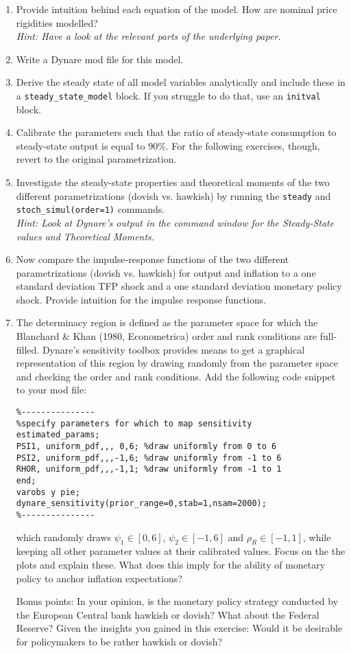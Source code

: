 \documentclass{article}
\begin{document}
\begin{enumerate}
	\item Provide intuition behind each equation of the model. How are nominal price rigidities modelled?\\\emph{Hint: Have a look at the relevant parts of the underlying paper.}
  \item Write a Dynare mod file for this model.
	\item Derive the steady state of all model variables analytically and include these in a \texttt{steady\_state\_model} block.
   If you struggle to do that, use an \texttt{initval} block.
	\item Calibrate the parameters such that the ratio of steady-state consumption to steady-state output is equal to 90\%.
  For the following exercises, though, revert to the original parametrization.		
	\item Investigate the steady-state properties and theoretical moments of the two different parametrizations (dovish vs. hawkish) 
    by running the \texttt{steady} and \texttt{stoch\_simul(order=1)} commands.\\\emph{Hint: Look at Dynare's output in the command window for the Steady-State values and Theoretical Moments.}
	\item Now compare the impulse-response functions of the two different parametrizations (dovish vs. hawkish) for output and inflation
    to a one standard deviation TFP shock and a one standard deviation monetary policy shock.
  Provide intuition for the impulse response functions.
	\item The determinacy region is defined as the parameter space for which the Blanchard \& Khan (1980, Econometrica) order and rank conditions are full-filled.
  Dynare's sensitivity toolbox provides means to get a graphical representation of this region by drawing randomly from the parameter space and checking the order and rank conditions.
  Add the following code snippet to your mod file:
\begin{verbatim}
%---------------
%specify parameters for which to map sensitivity
estimated_params;
PSI1, uniform_pdf,,, 0,6; %draw uniformly from 0 to 6
PSI2, uniform_pdf,,,-1,6; %draw uniformly from -1 to 6
RHOR, uniform_pdf,,,-1,1; %draw uniformly from -1 to 1
end;
varobs y pie;
dynare_sensitivity(prior_range=0,stab=1,nsam=2000);		
%---------------
\end{verbatim}	
which randomly draws $\psi_1 \in [0,6]$, $\psi_2 \in [-1,6]$ and $\rho_R \in [-1,1]$, while keeping all other parameter values at their calibrated values.
Focus on the the plots and explain these.
What does this imply for the ability of monetary policy to anchor inflation expectations?
\item[Bonus points:] In your opinion, is the monetary policy strategy conducted by the European Central bank hawkish or dovish?
What about the Federal Reserve?
Given the insights you gained in this exercise:
Would it be desirable for policymakers to be rather hawkish or dovish?
\end{enumerate}
\end{document}
